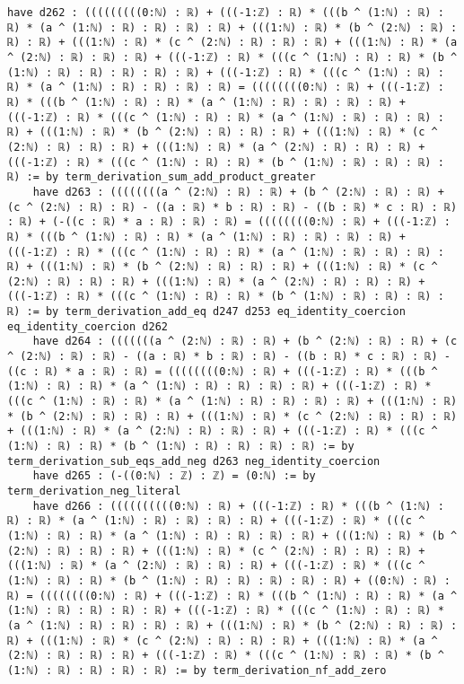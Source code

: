 \documentclass{article}
\begin{document}
\begin{tcolorbox}[colback=white!10, width=\linewidth]
\begin{lstlisting}[language=Lean4]
    have d262 : (((((((((0:ℕ) : ℝ) + (((-1:ℤ) : ℝ) * (((b ^ (1:ℕ) : ℝ) : ℝ) * (a ^ (1:ℕ) : ℝ) : ℝ) : ℝ) : ℝ) + (((1:ℕ) : ℝ) * (b ^ (2:ℕ) : ℝ) : ℝ) : ℝ) + (((1:ℕ) : ℝ) * (c ^ (2:ℕ) : ℝ) : ℝ) : ℝ) + (((1:ℕ) : ℝ) * (a ^ (2:ℕ) : ℝ) : ℝ) : ℝ) + (((-1:ℤ) : ℝ) * (((c ^ (1:ℕ) : ℝ) : ℝ) * (b ^ (1:ℕ) : ℝ) : ℝ) : ℝ) : ℝ) : ℝ) + (((-1:ℤ) : ℝ) * (((c ^ (1:ℕ) : ℝ) : ℝ) * (a ^ (1:ℕ) : ℝ) : ℝ) : ℝ) : ℝ) = ((((((((0:ℕ) : ℝ) + (((-1:ℤ) : ℝ) * (((b ^ (1:ℕ) : ℝ) : ℝ) * (a ^ (1:ℕ) : ℝ) : ℝ) : ℝ) : ℝ) + (((-1:ℤ) : ℝ) * (((c ^ (1:ℕ) : ℝ) : ℝ) * (a ^ (1:ℕ) : ℝ) : ℝ) : ℝ) : ℝ) + (((1:ℕ) : ℝ) * (b ^ (2:ℕ) : ℝ) : ℝ) : ℝ) + (((1:ℕ) : ℝ) * (c ^ (2:ℕ) : ℝ) : ℝ) : ℝ) + (((1:ℕ) : ℝ) * (a ^ (2:ℕ) : ℝ) : ℝ) : ℝ) + (((-1:ℤ) : ℝ) * (((c ^ (1:ℕ) : ℝ) : ℝ) * (b ^ (1:ℕ) : ℝ) : ℝ) : ℝ) : ℝ) := by term_derivation_sum_add_product_greater
    have d263 : ((((((((a ^ (2:ℕ) : ℝ) : ℝ) + (b ^ (2:ℕ) : ℝ) : ℝ) + (c ^ (2:ℕ) : ℝ) : ℝ) - ((a : ℝ) * b : ℝ) : ℝ) - ((b : ℝ) * c : ℝ) : ℝ) : ℝ) + (-((c : ℝ) * a : ℝ) : ℝ) : ℝ) = ((((((((0:ℕ) : ℝ) + (((-1:ℤ) : ℝ) * (((b ^ (1:ℕ) : ℝ) : ℝ) * (a ^ (1:ℕ) : ℝ) : ℝ) : ℝ) : ℝ) + (((-1:ℤ) : ℝ) * (((c ^ (1:ℕ) : ℝ) : ℝ) * (a ^ (1:ℕ) : ℝ) : ℝ) : ℝ) : ℝ) + (((1:ℕ) : ℝ) * (b ^ (2:ℕ) : ℝ) : ℝ) : ℝ) + (((1:ℕ) : ℝ) * (c ^ (2:ℕ) : ℝ) : ℝ) : ℝ) + (((1:ℕ) : ℝ) * (a ^ (2:ℕ) : ℝ) : ℝ) : ℝ) + (((-1:ℤ) : ℝ) * (((c ^ (1:ℕ) : ℝ) : ℝ) * (b ^ (1:ℕ) : ℝ) : ℝ) : ℝ) : ℝ) := by term_derivation_add_eq d247 d253 eq_identity_coercion eq_identity_coercion d262
    have d264 : (((((((a ^ (2:ℕ) : ℝ) : ℝ) + (b ^ (2:ℕ) : ℝ) : ℝ) + (c ^ (2:ℕ) : ℝ) : ℝ) - ((a : ℝ) * b : ℝ) : ℝ) - ((b : ℝ) * c : ℝ) : ℝ) - ((c : ℝ) * a : ℝ) : ℝ) = ((((((((0:ℕ) : ℝ) + (((-1:ℤ) : ℝ) * (((b ^ (1:ℕ) : ℝ) : ℝ) * (a ^ (1:ℕ) : ℝ) : ℝ) : ℝ) : ℝ) + (((-1:ℤ) : ℝ) * (((c ^ (1:ℕ) : ℝ) : ℝ) * (a ^ (1:ℕ) : ℝ) : ℝ) : ℝ) : ℝ) + (((1:ℕ) : ℝ) * (b ^ (2:ℕ) : ℝ) : ℝ) : ℝ) + (((1:ℕ) : ℝ) * (c ^ (2:ℕ) : ℝ) : ℝ) : ℝ) + (((1:ℕ) : ℝ) * (a ^ (2:ℕ) : ℝ) : ℝ) : ℝ) + (((-1:ℤ) : ℝ) * (((c ^ (1:ℕ) : ℝ) : ℝ) * (b ^ (1:ℕ) : ℝ) : ℝ) : ℝ) : ℝ) := by term_derivation_sub_eqs_add_neg d263 neg_identity_coercion
    have d265 : (-((0:ℕ) : ℤ) : ℤ) = (0:ℕ) := by term_derivation_neg_literal
    have d266 : ((((((((((0:ℕ) : ℝ) + (((-1:ℤ) : ℝ) * (((b ^ (1:ℕ) : ℝ) : ℝ) * (a ^ (1:ℕ) : ℝ) : ℝ) : ℝ) : ℝ) + (((-1:ℤ) : ℝ) * (((c ^ (1:ℕ) : ℝ) : ℝ) * (a ^ (1:ℕ) : ℝ) : ℝ) : ℝ) : ℝ) + (((1:ℕ) : ℝ) * (b ^ (2:ℕ) : ℝ) : ℝ) : ℝ) + (((1:ℕ) : ℝ) * (c ^ (2:ℕ) : ℝ) : ℝ) : ℝ) + (((1:ℕ) : ℝ) * (a ^ (2:ℕ) : ℝ) : ℝ) : ℝ) + (((-1:ℤ) : ℝ) * (((c ^ (1:ℕ) : ℝ) : ℝ) * (b ^ (1:ℕ) : ℝ) : ℝ) : ℝ) : ℝ) : ℝ) + ((0:ℕ) : ℝ) : ℝ) = ((((((((0:ℕ) : ℝ) + (((-1:ℤ) : ℝ) * (((b ^ (1:ℕ) : ℝ) : ℝ) * (a ^ (1:ℕ) : ℝ) : ℝ) : ℝ) : ℝ) + (((-1:ℤ) : ℝ) * (((c ^ (1:ℕ) : ℝ) : ℝ) * (a ^ (1:ℕ) : ℝ) : ℝ) : ℝ) : ℝ) + (((1:ℕ) : ℝ) * (b ^ (2:ℕ) : ℝ) : ℝ) : ℝ) + (((1:ℕ) : ℝ) * (c ^ (2:ℕ) : ℝ) : ℝ) : ℝ) + (((1:ℕ) : ℝ) * (a ^ (2:ℕ) : ℝ) : ℝ) : ℝ) + (((-1:ℤ) : ℝ) * (((c ^ (1:ℕ) : ℝ) : ℝ) * (b ^ (1:ℕ) : ℝ) : ℝ) : ℝ) : ℝ) := by term_derivation_nf_add_zero

\end{lstlisting}
\end{tcolorbox}
\end{document}
